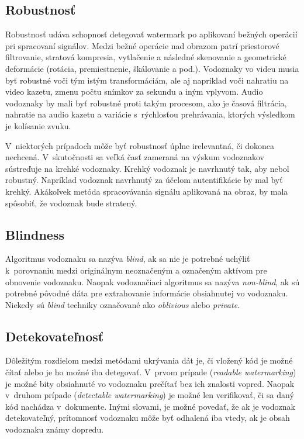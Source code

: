 \subsection{Robustnosť}
Robustnosť udáva schopnosť detegovať watermark po aplikovaní bežných operácií pri spracovaní signálov. Medzi bežné operácie nad obrazom patrí priestorové filtrovanie, stratová kompresia, vytlačenie a následné skenovanie a geometrické deformácie (rotácia, premiestnenie, škálovanie a pod.). Vodoznaky vo videu musia byť robustné voči tým istým transformáciám, ale aj napríklad voči nahratiu na video kazetu, zmenu počtu snímkov za sekundu a iným vplyvom. Audio vodoznaky by mali byť robustné proti takým procesom, ako je časová filtrácia, nahratie na audio kazetu a variácie s~rýchlosťou prehrávania, ktorých výsledkom je kolísanie zvuku.

V~niektorých prípadoch môže byť robustnosť úplne irelevantná, či dokonca nechcená. V~skutočnosti sa veľká časť zameraná na výskum vodoznakov sústreďuje na krehké vodoznaky. Krehký vodoznak je navrhnutý tak, aby nebol robustný. Napríklad vodoznak navrhnutý za účelom autentifikácie by mal byť krehký. Akákoľvek metóda spracovávania signálu aplikovaná na obraz, by mala spôsobiť, že vodoznak bude stratený. \cite{Cox}

\subsection{Blindness}
Algoritmus vodoznaku sa nazýva {\it blind}, ak sa nie je potrebné uchýliť k~porovnaniu medzi originálnym neoznačeným a označeným aktívom pre obnovenie vodoznaku. Naopak vodoznačiaci algoritmus sa nazýva {\it non-blind}, ak sú potrebné pôvodné dáta pre extrahovanie informácie obsiahnutej vo vodoznaku. Niekedy sú {\it blind} techniky označované ako {\it oblivious} alebo {\it private}. \cite{Barni}

\subsection{Detekovateľnosť}
Dôležitým rozdielom medzi metódami ukrývania dát je, či vložený kód je možné čítať alebo je ho možné iba detegovať. V~prvom prípade ({\it readable watermarking}) je možné bity obsiahnuté vo vodoznaku prečítať bez ich znalosti vopred. Naopak v~druhom prípade ({\it detectable watermarking}) je možné len verifikovať, či sa daný kód nachádza v~dokumente. Inými slovami, je možné povedať, že ak je vodoznak detekovateľný, prítomnosť vodoznaku môže byť odhalená iba vtedy, ak je obsah vodoznaku známy dopredu. \cite{Barni}

